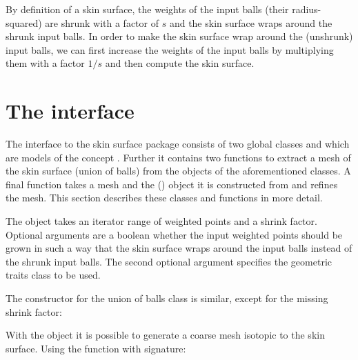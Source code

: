 By definition of a skin surface, the weights of the input balls (their
radius-squared) are shrunk with a factor of $s$ and the skin surface
wraps around the shrunk input balls. In order to make the skin surface
wrap around the (unshrunk) input balls, we can first increase the
weights of the input balls by multiplying them with a factor $1/s$ and
then compute the skin surface.


\section{The interface}
The interface to the skin surface package consists of two global
classes  and  which are
models of the concept . Further it contains two
functions to extract a mesh of the skin surface (union of balls) from
the objects of the aforementioned classes. A final function takes a
mesh and the  () object it
is constructed from and refines the mesh. This section describes these
classes and functions in more detail.

The  object takes an iterator range of weighted
points and a shrink factor. Optional arguments are a boolean whether
the input weighted points should be grown in such a way that the skin
surface wraps around the input balls instead of the shrunk input
balls.  The second optional argument specifies the geometric traits
class to be used.


The constructor for the union of balls class is similar, except for
the missing shrink factor:



With the  object it is possible to generate a
coarse mesh isotopic to the skin surface. Using the function
 with signature:


